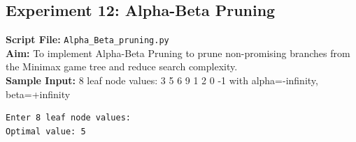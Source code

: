 \subsection*{Experiment 12: Alpha-Beta Pruning}
\textbf{Script File:} \texttt{Alpha_Beta_pruning.py} \\[4pt]
\textbf{Aim:} To implement Alpha-Beta Pruning to prune non-promising branches from the Minimax game tree and reduce search complexity. \\[4pt]
\textbf{Sample Input:} 8 leaf node values: 3 5 6 9 1 2 0 -1 with alpha=-infinity, beta=+infinity \\[6pt]
\begin{tcolorbox}[colback=black!5!white,colframe=black!75!white,title=Terminal Execution Output - Alpha-Beta Pruning]
\begin{verbatim}
Enter 8 leaf node values: 
Optimal value: 5
\end{verbatim}
\end{tcolorbox}


